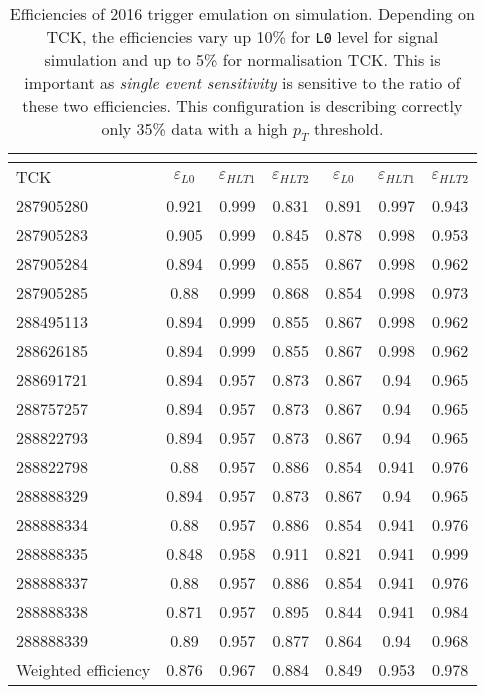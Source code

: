 \begin{table}[H]
\begin{center}
\begin{tabular}{ l |  c  c  c | c  c  c }\toprule
	\multicolumn{1}{c|}{} & \multicolumn{3}{c|}{\Bmumumu } & \multicolumn{3}{c}{\bjpsimumuk} \\ \hline
 TCK & $\varepsilon_{L0}$ & $\varepsilon_{HLT1}$ & $\varepsilon_{HLT2}$ & $\varepsilon_{L0}$ & $\varepsilon_{HLT1}$ & $\varepsilon_{HLT2}$ \\
\hline
287905280 & 0.921 & 0.999 & 0.831 & 0.891 & 0.997 & 0.943 \\
287905283 & 0.905 & 0.999 & 0.845 & 0.878 & 0.998 & 0.953 \\
287905284 & 0.894 & 0.999 & 0.855 & 0.867 & 0.998 & 0.962 \\
287905285 & 0.88 & 0.999 & 0.868 & 0.854 & 0.998 & 0.973 \\
288495113 & 0.894 & 0.999 & 0.855 & 0.867 & 0.998 & 0.962 \\
288626185 & 0.894 & 0.999 & 0.855 & 0.867 & 0.998 & 0.962 \\
288691721 & 0.894 & 0.957 & 0.873 & 0.867 & 0.94 & 0.965 \\
288757257 & 0.894 & 0.957 & 0.873 & 0.867 & 0.94 & 0.965 \\
288822793 & 0.894 & 0.957 & 0.873 & 0.867 & 0.94 & 0.965 \\
288822798 & 0.88 & 0.957 & 0.886 & 0.854 & 0.941 & 0.976 \\
288888329 & 0.894 & 0.957 & 0.873 & 0.867 & 0.94 & 0.965 \\
288888334 & 0.88 & 0.957 & 0.886 & 0.854 & 0.941 & 0.976 \\
288888335 & 0.848 & 0.958 & 0.911 & 0.821 & 0.941 & 0.999 \\
288888337 & 0.88 & 0.957 & 0.886 & 0.854 & 0.941 & 0.976 \\
288888338 & 0.871 & 0.957 & 0.895 & 0.844 & 0.941 & 0.984 \\
288888339 & 0.89 & 0.957 & 0.877 & 0.864 & 0.94 & 0.968 \\
\hline
Weighted efficiency & 0.876 & 0.967 & 0.884 & 0.849 & 0.953 & 0.978 \\
\bottomrule
\end{tabular}
\end{center}
\caption{Efficiencies of 2016 trigger emulation on simulation. Depending on TCK, the efficiencies vary up 10\% for \texttt{L0} level for signal simulation and up to 5\% for normalisation TCK. This is important as \textit{single event sensitivity} is sensitive to the ratio of these two efficiencies. This configuration is describing correctly only 35\% data with a high $p_{T}$ threshold.}
\label{tab:L0andHLT1Calib}
\end{table}



